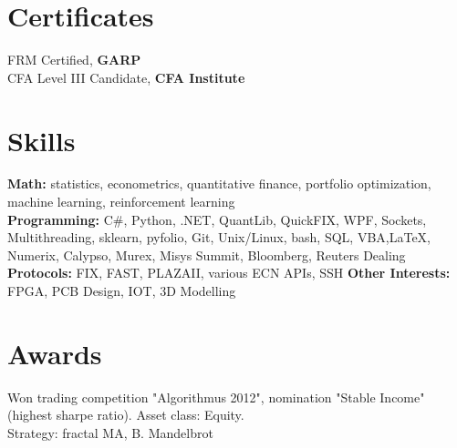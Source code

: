 \documentclass[a4paper,hidelinks]{article}
\newcommand{\resumeSubHeadingListStart}{\begin{itemize}[leftmargin=0.15in, label={}]}
\newcommand{\resumeSubHeadingListEnd}{\end{itemize}}
\begin{document}

\vspace{-2pt}
\section{Certificates}
\resumeSubHeadingListStart
\small{\item{
{FRM Certified, \textbf{{GARP}}} \\ %
{CFA Level III Candidate, \textbf{{CFA Institute}}} %
}}
\resumeSubHeadingListEnd

\vspace{-9pt}
\section{Skills}
\resumeSubHeadingListStart
\small{\item{
              \textbf{{Math:}}{ statistics, econometrics, quantitative finance, portfolio optimization, machine learning, reinforcement learning\\} %
              \textbf{{Programming:}}{ C\#, Python, .NET, QuantLib, QuickFIX, WPF, Sockets, Multithreading, sklearn, pyfolio, Git, Unix/Linux, bash, SQL, VBA,\LaTeX, Numerix, Calypso, Murex, Misys Summit, Bloomberg, Reuters Dealing \\} %
              \textbf{{Protocols:}}{ FIX, FAST, PLAZAII, various ECN APIs, SSH } %
              \textbf{{Other Interests:}}{ FPGA, PCB Design, IOT, 3D Modelling} %
        }}

\resumeSubHeadingListEnd
\vspace{-11pt}
\section{Awards}
\begin{description}%
  \item{Won trading competition "Algorithmus 2012", nomination "Stable Income" (highest sharpe ratio). Asset class: Equity.\\Strategy: fractal MA, B. Mandelbrot}
  \vspace{-5pt}
\end{description}
\end{document}
